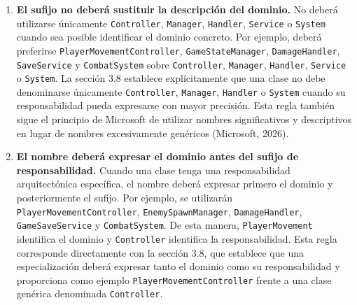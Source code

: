 \begin{enumerate}
\begin{itemize}
\item \texttt{Repository}: abstraer el acceso y recuperación de una colección de entidades o datos.

\end{itemize}

El propósito de esta distinción es evitar que un sufijo se utilice como decoración nominal. La sección 3.8 establece precisamente que el sufijo debe corresponder con una responsabilidad real. Además, las guías de .NET establecen que los nombres deben comunicar inmediatamente la función del elemento y utilizan convenciones específicas para determinados tipos y responsabilidades (Microsoft, 2022, 2025).

\item \textbf{El sufijo no deberá sustituir la descripción del dominio.} No deberá utilizarse únicamente \texttt{Controller}, \texttt{Manager}, \texttt{Handler}, \texttt{Service} o \texttt{System} cuando sea posible identificar el dominio concreto. Por ejemplo, deberá preferirse \texttt{PlayerMovementController}, \texttt{GameStateManager}, \texttt{DamageHandler}, \texttt{SaveService} y \texttt{CombatSystem} sobre \texttt{Controller}, \texttt{Manager}, \texttt{Handler}, \texttt{Service} o \texttt{System}. La sección 3.8 establece explícitamente que una clase no debe denominarse únicamente \texttt{Controller}, \texttt{Manager}, \texttt{Handler} o \texttt{System} cuando su responsabilidad pueda expresarse con mayor precisión. Esta regla también sigue el principio de Microsoft de utilizar nombres significativos y descriptivos en lugar de nombres excesivamente genéricos (Microsoft, 2026).

\item \textbf{El nombre deberá expresar el dominio antes del sufijo de responsabilidad.} Cuando una clase tenga una responsabilidad arquitectónica específica, el nombre deberá expresar primero el dominio y posteriormente el sufijo. Por ejemplo, se utilizarán \texttt{PlayerMovementController}, \texttt{EnemySpawnManager}, \texttt{DamageHandler}, \texttt{GameSaveService} y \texttt{CombatSystem}. De esta manera, \texttt{PlayerMovement} identifica el dominio y \texttt{Controller} identifica la responsabilidad. Esta regla corresponde directamente con la sección 3.8, que establece que una especialización deberá expresar tanto el dominio como su responsabilidad y proporciona como ejemplo \texttt{PlayerMovementController} frente a una clase genérica denominada \texttt{Controller}.


\end{enumerate}
